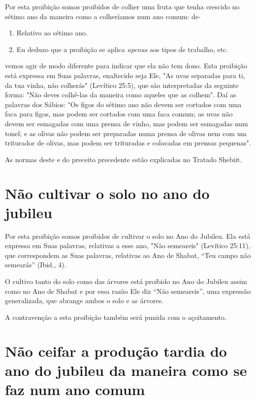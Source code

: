 Por esta proibição somos proibidos de colher uma fruta que tenha
crescido no sétimo ano da maneira como a colheríamos num ano comum: de-


\begin{enumerate}
\def\labelenumi{\arabic{enumi}.}
\setcounter{enumi}{390}
\item
 
 Relativo ao sétimo ano.
 
\item
 
 Eu deduzo que a proibição se aplica \emph{apenas} aos tipos de
 trabalho, etc.
 
\end{enumerate}

vemos agir de modo diferente para indicar que ela 
não tem dono. Esta
proibi­ção está expressa em Suas palavras, enaltecido seja Ele, "As uvas
separadas para ti, da tua vinha, não colherás" (Levítico 25:5), que são
interpretadas da seguin­te forma: "Não deves colhê-las da maneira como
aqueles que as colhem". Daí as palavras dos Sábios: "Os figos do sétimo
ano não devem ser cortados com uma faca para figos, mas podem ser
cortados com uma faca comum; as uvas não devem ser esmagadas com uma
prensa de vinho, mas podem ser esmaga­das num tonel; e as olivas não
podem ser preparadas numa prensa de olivas nem com um triturador de
olivas, mas podem ser trituradas e colocadas em prensas pequenas".

As normas deste e do preceito precedente estão explicadas no Tra­tado
Shebiit.

\section{Não cultivar o solo no ano do jubileu}

Por esta proibição somos proibidos de cultivar o solo no Ano do
Ju­bileu. Ela está expressa em Suas palavras, relativas a esse ano, "Não
semeareis" (Levítico 25:11), que correspondem as Suas palavras,
relativas ao Ano de Sha­bat, ``Teu campo não semearás'' (Ibid., 4).

O cultivo tanto do solo como das árvores está proibido no Ano do Jubileu
assim como no Ano de Shabat e por essa razão Ele diz ``Não semeareis'',
uma expressão generalizada, que abrange ambos o solo e as árvores.

A contravenção a esta proibição também será punida com o açoitamento.

\section{Não ceifar a produção tardia do ano do jubileu da maneira como se
faz num ano comum}

